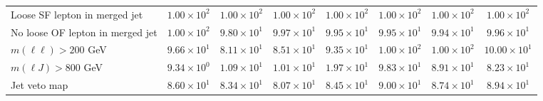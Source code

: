 \begin{table}[htp]
{\begin{tabular}{l | c c c c | c c c}
      Loose SF lepton in merged jet & $1.00 \times 10^{2}$ & $1.00 \times 10^{2}$ & $1.00 \times 10^{2}$ & $1.00 \times 10^{2}$ & $1.00 \times 10^{2}$ & $1.00 \times 10^{2}$ & $1.00 \times 10^{2}$ \\
      No loose OF lepton in merged jet & $1.00 \times 10^{2}$ & $9.80 \times 10^{1}$ & $9.97 \times 10^{1}$ & $9.95 \times 10^{1}$ & $9.95 \times 10^{1}$ & $9.94 \times 10^{1}$ & $9.96 \times 10^{1}$ \\
      $m(\ell\ell) > 200$ GeV & $9.66 \times 10^{1}$ & $8.11 \times 10^{1}$ & $8.51 \times 10^{1}$ & $9.35 \times 10^{1}$ & $1.00 \times 10^{2}$ & $1.00 \times 10^{2}$ & $10.00 \times 10^{1}$ \\
      $m(\ell J) > 800$ GeV & $9.34 \times 10^{0}$ & $1.09 \times 10^{1}$ & $1.01 \times 10^{1}$ & $1.97 \times 10^{1}$ & $9.83 \times 10^{1}$ & $8.91 \times 10^{1}$ & $8.23 \times 10^{1}$ \\
      Jet veto map & $8.60 \times 10^{1}$ & $8.34 \times 10^{1}$ & $8.07 \times 10^{1}$ & $8.45 \times 10^{1}$ & $9.00 \times 10^{1}$ & $8.74 \times 10^{1}$ & $8.94 \times 10^{1}$ \\
      \hline
    \end{tabular}
  }
\end{table}

